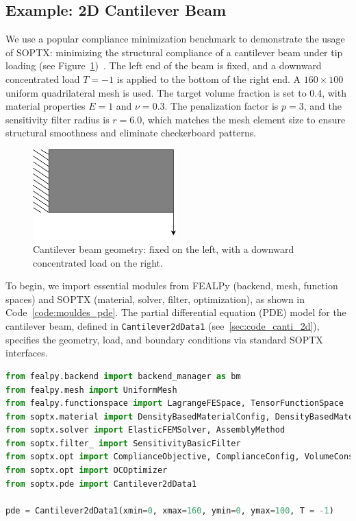 \documentclass[mathpazo]{cicp}
\begin{document}
\subsection{Example: 2D Cantilever Beam}\label{sec:exp_canti_beam}
We use a popular compliance minimization benchmark to demonstrate the usage of SOPTX: minimizing the structural compliance of a cantilever beam under tip loading (see Figure~\ref{fig:cantilever})~\cite{bendsoe2013topology}. The left end of the beam is fixed, and a downward concentrated load $T = -1$ is applied to the bottom of the right end. A $160 \times 100$ uniform quadrilateral mesh is used. The target volume fraction is set to 0.4, with material properties $E = 1$ and $\nu = 0.3$. The penalization factor is $p = 3$, and the sensitivity filter radius is $r = 6.0$, which matches the mesh element size to ensure structural smoothness and eliminate checkerboard patterns.
\begin{figure}[htbp]
	\centering
	\includegraphics[width=0.5\textwidth]{figures/cantilever_2d.png}
	\caption{Cantilever beam geometry: fixed on the left, with a downward concentrated load on the right.}
	\label{fig:cantilever}
\end{figure}

To begin, we import essential modules from FEALPy (backend, mesh, function spaces) and SOPTX (material, solver, filter, optimization), as shown in Code~\ref{code:mouldes_pde}. The partial differential equation (PDE) model for the cantilever beam, defined in \texttt{Cantilever2dData1} (see~\ref{sec:code_canti_2d}), specifies the geometry, load, and boundary conditions via standard SOPTX interfaces.

\begin{lstlisting}[language=python, caption={Module imports and PDE model}, label={code:mouldes_pde}]
from fealpy.backend import backend_manager as bm
from fealpy.mesh import UniformMesh
from fealpy.functionspace import LagrangeFESpace, TensorFunctionSpace
from soptx.material import DensityBasedMaterialConfig, DensityBasedMaterialInstance
from soptx.solver import ElasticFEMSolver, AssemblyMethod
from soptx.filter_ import SensitivityBasicFilter
from soptx.opt import ComplianceObjective, ComplianceConfig, VolumeConstraint, VolumeConfig
from soptx.opt import OCOptimizer
from soptx.pde import Cantilever2dData1

pde = Cantilever2dData1(xmin=0, xmax=160, ymin=0, ymax=100,	T = -1)
\end{lstlisting}
\end{document}
